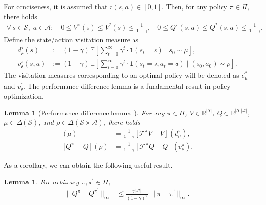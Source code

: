 \documentclass[10pt]{article}
\newcommand{\calA}{\mathcal{A}}
\newcommand{\calS}{\mathcal{S}}
\newcommand{\calT}{\mathcal{T}}
\newcommand{\calF}{\mathcal{F}}
\newcommand{\E}{\mathbb{E}}
\newcommand{\ls}{\left}
\newcommand{\rs}{\right}
\theoremstyle{plain}
\newtheorem{lemma}[theorem]{Lemma}
\theoremstyle{definition}
\begin{document}
{For conciseness, it is assumed that  $r(s,a) \in [0,1]$.} Then,  for any policy $\pi \in \Pi$, there holds
\begin{align}
    \forall\, s\in\calS, \; a\in\calA: \quad 0 \leq V^\pi(s) \leq V^*(s) \leq \frac{1}{1-\gamma}, \quad 0\leq Q^{\pi}(s,a) \leq Q^*(s,a) \leq \frac{1}{1-\gamma}.
    \label{eq:bounded-policy-values}
\end{align}
 Define the state/action visitation measure as
\begin{align*}
    d^\pi_\mu(s) &:= (1-\gamma) \,\E\ls[ \sum_{t=0}^{\infty} \gamma^t \cdot \mathbf{1}(s_t = s) \; \bigg | \; s_0 \sim\mu \rs], \\
    v^\pi_{\rho}(s,a) &:= (1-\gamma)\, \E\ls[ \sum_{t=0}^\infty \gamma^t \cdot \mathbf{1}(s_t=s, a_t=a) \; \bigg | \; (s_0, a_0) \sim \rho \rs].
\end{align*}
The visitation measures corresponding to an optimal policy will be denoted as $d^*_\mu$ and $v^*_\rho$. The  performance difference lemma is a fundamental result in policy optimization.
\begin{lemma}[Performance difference lemma~\citep{kakade2002approximately,liu2025tdpmd}]
    For any $\pi\in\Pi$, $V\in\mathbb{R}^{|\calS|}$, $Q\in\mathbb{R}^{|\calS||\calA|}$, $\mu\in\Delta(\calS)$, and $\rho\in\Delta(\calS\times\calA)$, there holds
    \begin{align*}
        [V^\pi - V](\mu) &= \frac{1}{1-\gamma} \ls[ \calT^\pi V - V \rs](d^\pi_\mu), \\
        [Q^\pi - Q](\rho) &= \frac{1}{1-\gamma} \ls[ \calF^\pi Q - Q \rs](v^\pi_\rho).
    \end{align*}
    \label{lem:pdl}
\end{lemma}
\noindent As a corollary, we can obtain the following useful result.
\begin{lemma}
    For arbitrary $\pi, \pi^\prime \in \Pi$,
    \begin{align*}
        \| Q^{\pi} - Q^{\pi^\prime} \|_\infty &\leq \frac{\gamma |\calA|}{(1-\gamma)^2} \cdot \| \pi - \pi^\prime \|_\infty.
    \end{align*}
    \label{lem:Lip:Q-value}
\end{lemma}
\end{document}
